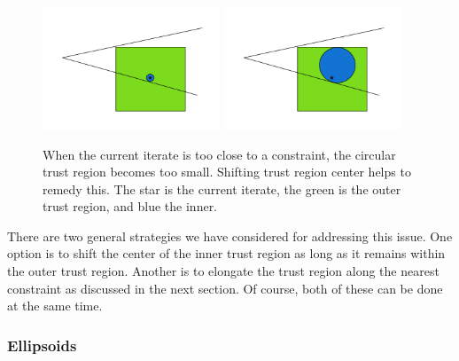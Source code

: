 \begin{figure}[h]
    \centering
    \includegraphics[width=200px]{images/small_circle.png}
    \includegraphics[width=200px]{images/shifted_center.png}
    \caption{When the current iterate is too close to a constraint, the circular trust region becomes too small. Shifting trust region center helps to remedy this. The star is the current iterate, the green is the outer trust region, and blue the inner.}
\end{figure}

There are two general strategies we have considered for addressing this issue.
One option is to shift the center of the inner trust region as long as it remains within the outer trust region.
Another is to elongate the trust region along the nearest constraint as discussed in the next section.
Of course, both of these can be done at the same time.


\subsubsection{Ellipsoids}

